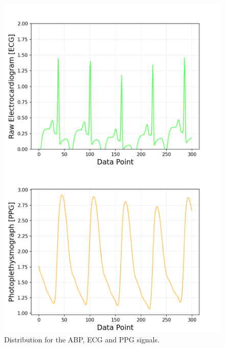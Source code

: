\documentclass{article}
\begin{document}
\begin{figure}[h!]
\begin{minipage}[b]{0.32\textwidth}
	\end{minipage}
	\begin{minipage}[b]{0.32\textwidth}
		\includegraphics[width=\textwidth]{plots/series_ECG_zoom.png}

	\end{minipage}
	\begin{minipage}[b]{0.32\textwidth}
		\includegraphics[width=\textwidth]{plots/series_PPG_zoom.png}
	\end{minipage}


	\caption{Distribution for the ABP, ECG and PPG signals.}
	\label{signals}
\end{figure}
\end{document}

